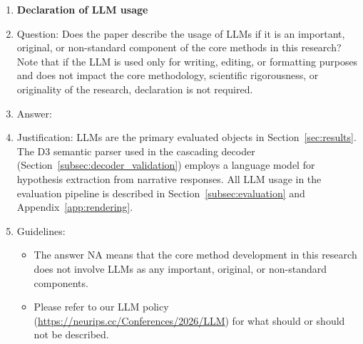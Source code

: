 \documentclass{article}
\theoremstyle{definition}
\begin{document}
\begin{enumerate}
\item {\bf Declaration of LLM usage}
    \item[] Question: Does the paper describe the usage of LLMs if it is an important, original, or non-standard component of the core methods in this research? Note that if the LLM is used only for writing, editing, or formatting purposes and does not impact the core methodology, scientific rigorousness, or originality of the research, declaration is not required.
    \item[] Answer: \answerYes{}
    \item[] Justification: LLMs are the primary evaluated objects in Section~\ref{sec:results}. The D3 semantic parser used in the cascading decoder (Section~\ref{subsec:decoder_validation}) employs a language model for hypothesis extraction from narrative responses. All LLM usage in the evaluation pipeline is described in Section~\ref{subsec:evaluation} and Appendix~\ref{app:rendering}.
    \item[] Guidelines:
    \begin{itemize}
        \item The answer NA means that the core method development in this research does not involve LLMs as any important, original, or non-standard components.
        \item Please refer to our LLM policy (\url{https://neurips.cc/Conferences/2026/LLM}) for what should or should not be described.
    \end{itemize}

\end{enumerate}




\end{document}
